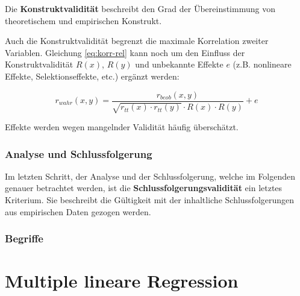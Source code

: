 \documentclass{article}
\numberwithin{equation}{section}
\begin{document}
Die \textbf{Konstruktvalidität} beschreibt den Grad der Übereinstimmung von theoretischem und empirischen Konstrukt.

Auch die Konstruktvalidität begrenzt die maximale Korrelation zweiter Variablen. Gleichung \ref{eq:korr-rel} kann noch um den Einfluss der Konstruktvalidität $R(x)$, $R(y)$ und unbekannte Effekte $e$ (z.B. nonlineare Effekte, Selektionseffekte, etc.) ergänzt werden:

\begin{equation}
r_{wahr}(x,y) = \frac{r_{beob}(x,y)}{\sqrt{r_{tt}(x) \cdot r_{tt}(y)} \cdot R(x) \cdot R(y)} + e
\end{equation}

Effekte werden wegen mangelnder Validität häufig überschätzt.

\subsubsection{Analyse und Schlussfolgerung}

Im letzten Schritt, der Analyse und der Schlussfolgerung, welche im Folgenden genauer betrachtet werden, ist die \textbf{Schlussfolgerungsvalidität} ein letztes Kriterium. Sie beschreibt die Gültigkeit mit der inhaltliche
Schlussfolgerungen aus empirischen Daten gezogen werden.

\subsubsection*{Begriffe}



\section{Multiple lineare Regression}
\end{document}
